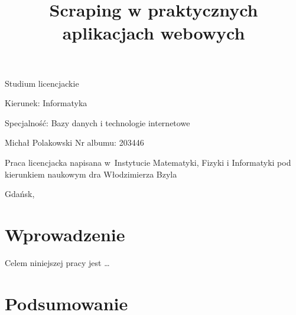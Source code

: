 \documentclass[12pt,a4paper,oneside,openany,parskip=full,parindent=full]{book}
\begin{document}
\begin{center}

\vspace{1cm}

Studium licencjackie
\end{center}

\vspace{1cm}

\noindent Kierunek: Informatyka

\noindent Specjalność: Bazy danych i technologie internetowe

\vspace{1cm}

{
\leftskip=10cm\noindent
Michał Polakowski\newline
Nr albumu: 203446

}

\vspace{2cm}

\title{Scraping w praktycznych aplikacjach webowych}
\makeatletter

\begin{center}
\LARGE\bf
\@title
\end{center}

\vspace{2cm}

{
\leftskip=10cm\noindent
Praca licencjacka\newline 
napisana w~Instytucie Matematyki, Fizyki i Informatyki\newline
pod kierunkiem naukowym\newline
dra Włodzimierza Bzyla

}

\vfill

\begin{center}
Gdańsk, \the\year
\end{center}
\thispagestyle{empty}

\clearpage
\thispagestyle{empty}
\clearpage

\tableofcontents

\clearpage


\chapter{Wprowadzenie}

Celem niniejszej pracy jest \ldots



\chapter{Podsumowanie}



\clearpage
{}
\begin{thebibliography}{99}
\setlength{\itemsep}{0pt}
\end{thebibliography}

\clearpage
\end{document}
